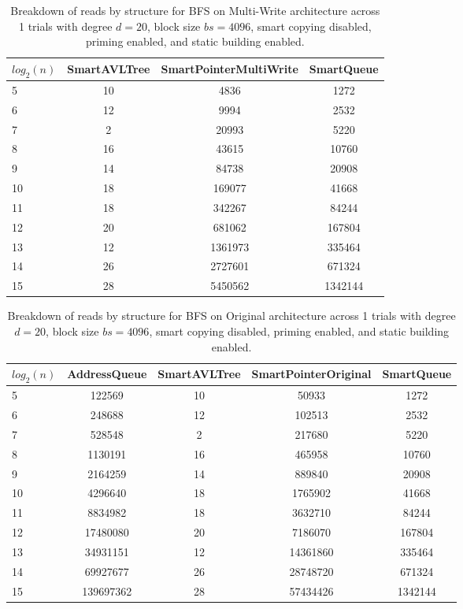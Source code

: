 \begin{table}[]
\centering
\begin{tabular}{|l|c|c|c|}
$log_2(n)$ & SmartAVLTree & SmartPointerMultiWrite & SmartQueue \\ \hline
5 & 10 & 4836 & 1272 \\ \hline
6 & 12 & 9994 & 2532 \\ \hline
7 & 2 & 20993 & 5220 \\ \hline
8 & 16 & 43615 & 10760 \\ \hline
9 & 14 & 84738 & 20908 \\ \hline
10 & 18 & 169077 & 41668 \\ \hline
11 & 18 & 342267 & 84244 \\ \hline
12 & 20 & 681062 & 167804 \\ \hline
13 & 12 & 1361973 & 335464 \\ \hline
14 & 26 & 2727601 & 671324 \\ \hline
15 & 28 & 5450562 & 1342144 \\ \hline
\end{tabular}
\caption{Breakdown of reads by structure for BFS on Multi-Write architecture across 1 trials with degree $d=20$, block size $bs=4096$, smart copying disabled, priming enabled, and static building enabled.}
    \label{tab:reads_by_structure_bfs_d20_bs4096_trials1_copiesfalse_primetrue_staticinsertiontrue_ptmultiwrite_movetrue}
\end{table}

\begin{table}[]
\centering
\begin{tabular}{|l|c|c|c|c|}
$log_2(n)$ & AddressQueue & SmartAVLTree & SmartPointerOriginal & SmartQueue \\ \hline
5 & 122569 & 10 & 50933 & 1272 \\ \hline
6 & 248688 & 12 & 102513 & 2532 \\ \hline
7 & 528548 & 2 & 217680 & 5220 \\ \hline
8 & 1130191 & 16 & 465958 & 10760 \\ \hline
9 & 2164259 & 14 & 889840 & 20908 \\ \hline
10 & 4296640 & 18 & 1765902 & 41668 \\ \hline
11 & 8834982 & 18 & 3632710 & 84244 \\ \hline
12 & 17480080 & 20 & 7186070 & 167804 \\ \hline
13 & 34931151 & 12 & 14361860 & 335464 \\ \hline
14 & 69927677 & 26 & 28748720 & 671324 \\ \hline
15 & 139697362 & 28 & 57434426 & 1342144 \\ \hline
\end{tabular}
\caption{Breakdown of reads by structure for BFS on Original architecture across 1 trials with degree $d=20$, block size $bs=4096$, smart copying disabled, priming enabled, and static building enabled.}
    \label{tab:reads_by_structure_bfs_d20_bs4096_trials1_copiesfalse_primetrue_staticinsertiontrue_ptoriginal_movefalse}
\end{table}

